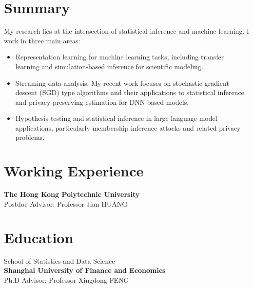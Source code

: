 \documentclass{resume}
\begin{document}

\section{\bf Summary }
\noindent 
My research lies at the intersection of statistical inference and machine learning.
I work in three main areas:
\begin{itemize}
	\item 
 Representation learning for machine learning tasks, including transfer learning
   and simulation-based inference for scientific modeling.
	\item 
 Streaming data analysis.
   My recent work focuses on stochastic gradient descent (SGD) type algorithms
   and their applications to statistical inference and privacy-preserving
   estimation for DNN-based models.
   	\item 
 Hypothesis testing and statistical inference in large language model applications,
   particularly membership inference attacks and related privacy problems.
\end{itemize}




   \section{\bf Working Experience }





\noindent \textbf{The Hong Kong Polytechnic University}\\
Postdoc Advisor: Professor Jian HUANG


\section{\bf Education }
\noindent School of Statistics and Data Science\\
\textbf{Shanghai University of Finance and Economics}\\
Ph.D Advisor: Professor Xingdong FENG
\end{document}
